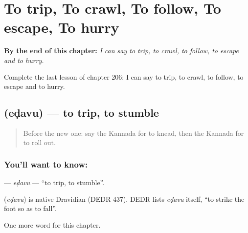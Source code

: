
\chapter{To trip, To crawl, To follow, To escape, To hurry}
\label{ch:ka-to-trip-to-crawl-to-follow-to-escape-to-hurry}

\begin{chapteropening}
\textbf{By the end of this chapter:} \emph{I can say to trip, to crawl, to follow, to escape and to hurry.}

Complete the last lesson of chapter 206: I can say to trip, to crawl, to follow, to escape and to hurry.
\end{chapteropening}

\section[\texorpdfstring{\kn{ಎಡವು} (eḍavu)}{ಎಡವು (eḍavu)}]{ (eḍavu) — to trip, to stumble}

\label{lesson:KA-C206-edavu}



\begin{quote}
Before the new one: say the Kannada for to knead, then the Kannada for to roll out.
\end{quote}

\subsection*{You'll want to know: }
\textbf{} — \emph{eḍavu} — \textquotedblleft{}to trip, to stumble\textquotedblright{}.

\begin{cousinweb}
\textbf{} (\emph{eḍavu}) is native Dravidian (DEDR 437). DEDR lists \emph{eḍavu} itself, \textquotedblleft{}to strike the foot so as to fall\textquotedblright{}.
\end{cousinweb}

\begin{grammarlens}[title={What you've built}]
One more word for this chapter.
\end{grammarlens}

